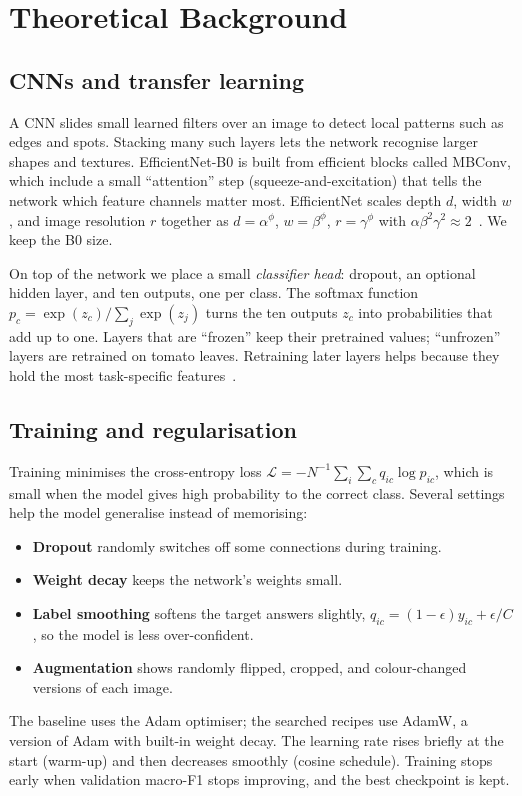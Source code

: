 \chapter{Theoretical Background}
\section{CNNs and transfer learning}
A CNN slides small learned filters over an image to detect local patterns such as edges and spots. Stacking many such layers lets the network recognise larger shapes and textures. EfficientNet-B0 is built from efficient blocks called MBConv, which include a small ``attention'' step (squeeze-and-excitation) that tells the network which feature channels matter most. EfficientNet scales depth $d$, width $w$, and image resolution $r$ together as $d=\alpha^\phi$, $w=\beta^\phi$, $r=\gamma^\phi$ with $\alpha\beta^2\gamma^2\approx2$~\cite{tan2019efficientnet}. We keep the B0 size.

On top of the network we place a small \emph{classifier head}: dropout, an optional hidden layer, and ten outputs, one per class. The softmax function $p_c=\exp(z_c)/\sum_j\exp(z_j)$ turns the ten outputs $z_c$ into probabilities that add up to one. Layers that are ``frozen'' keep their pretrained values; ``unfrozen'' layers are retrained on tomato leaves. Retraining later layers helps because they hold the most task-specific features~\cite{yosinski2014transfer}.

\section{Training and regularisation}
Training minimises the cross-entropy loss $\mathcal L=-N^{-1}\sum_i\sum_c q_{ic}\log p_{ic}$, which is small when the model gives high probability to the correct class. Several settings help the model generalise instead of memorising:
\begin{itemize}
\item \textbf{Dropout} randomly switches off some connections during training.
\item \textbf{Weight decay} keeps the network's weights small.
\item \textbf{Label smoothing} softens the target answers slightly, $q_{ic}=(1-\epsilon)y_{ic}+\epsilon/C$, so the model is less over-confident.
\item \textbf{Augmentation} shows randomly flipped, cropped, and colour-changed versions of each image.
\end{itemize}
The baseline uses the Adam optimiser; the searched recipes use AdamW, a version of Adam with built-in weight decay. The learning rate rises briefly at the start (warm-up) and then decreases smoothly (cosine schedule). Training stops early when validation macro-F1 stops improving, and the best checkpoint is kept.

